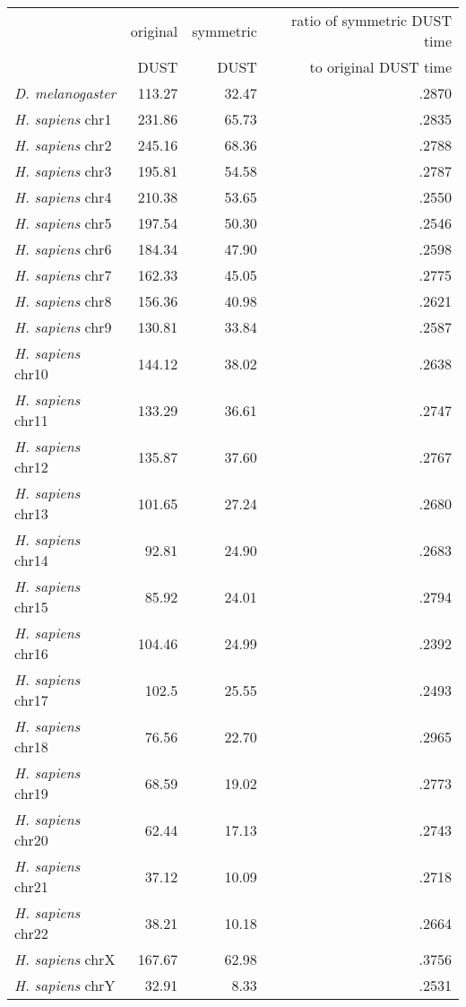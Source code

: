 \documentclass{article}
\begin{document}
\vskip 1cm
\begin{tabular}{|l|r|r|r|}
\hline
 & original & symmetric & ratio of symmetric DUST time\\
 & DUST\hfill\hfill     & DUST\hfill\hfill      & to original DUST time \hfill\hfill \\
\hline
{\it D. melanogaster} & 113.27   & 32.47 & .2870 \\
\hline
{\it H. sapiens} chr1  & 231.86 & 65.73 & .2835 \\
{\it H. sapiens} chr2  & 245.16 & 68.36 & .2788 \\
{\it H. sapiens} chr3  & 195.81 & 54.58 & .2787 \\
{\it H. sapiens} chr4  & 210.38 & 53.65 & .2550 \\
{\it H. sapiens} chr5  & 197.54 & 50.30 & .2546 \\
{\it H. sapiens} chr6  & 184.34 & 47.90 & .2598 \\
{\it H. sapiens} chr7  & 162.33 & 45.05 & .2775 \\
{\it H. sapiens} chr8  & 156.36 & 40.98 & .2621 \\
{\it H. sapiens} chr9  & 130.81 & 33.84 & .2587 \\
{\it H. sapiens} chr10 & 144.12 & 38.02 & .2638 \\
{\it H. sapiens} chr11 & 133.29 & 36.61 & .2747 \\
{\it H. sapiens} chr12 & 135.87 & 37.60 & .2767 \\
{\it H. sapiens} chr13 & 101.65 & 27.24 & .2680 \\
{\it H. sapiens} chr14 & 92.81  & 24.90 & .2683 \\
{\it H. sapiens} chr15 & 85.92  & 24.01 & .2794 \\
{\it H. sapiens} chr16 & 104.46 & 24.99 & .2392 \\
{\it H. sapiens} chr17 & 102.5  & 25.55 & .2493 \\
{\it H. sapiens} chr18 & 76.56  & 22.70 & .2965 \\
{\it H. sapiens} chr19 & 68.59  & 19.02 & .2773 \\
{\it H. sapiens} chr20 & 62.44  & 17.13 & .2743 \\
{\it H. sapiens} chr21 & 37.12  & 10.09 & .2718 \\
{\it H. sapiens} chr22 & 38.21  & 10.18 & .2664 \\
{\it H. sapiens} chrX  & 167.67 & 62.98 & .3756 \\
{\it H. sapiens} chrY  & 32.91  & 8.33  & .2531 \\
\hline
\end{tabular}
\end{document}
